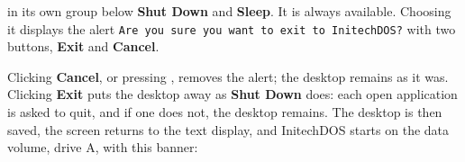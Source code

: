 in its own group below \textbf{Shut Down} and \textbf{Sleep}.  It is always
available.  Choosing it displays the alert \texttt{Are you sure you want to
exit to InitechDOS?} with two buttons, \textbf{Exit} and \textbf{Cancel}.

Clicking \textbf{Cancel}, or pressing , removes the alert; the
desktop remains as it was.  Clicking \textbf{Exit} puts the desktop away as
\textbf{Shut Down} does: each open application is asked to quit, and if one
does not, the desktop remains.  The desktop is then saved, the screen
returns to the text display, and InitechDOS starts on the data volume,
drive A, with this banner:


